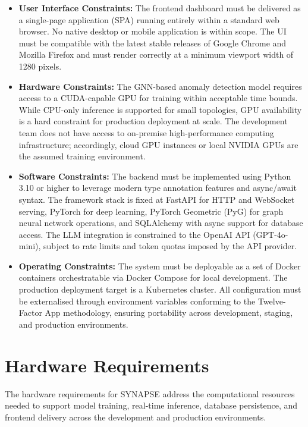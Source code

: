 \begin{itemize}

    \item \textbf{User Interface Constraints:} The frontend dashboard must be delivered as a single-page application (SPA) running entirely within a standard web browser. No native desktop or mobile application is within scope. The UI must be compatible with the latest stable releases of Google Chrome and Mozilla Firefox and must render correctly at a minimum viewport width of 1280 pixels.

    \item \textbf{Hardware Constraints:} The GNN-based anomaly detection model requires access to a CUDA-capable GPU for training within acceptable time bounds. While CPU-only inference is supported for small topologies, GPU availability is a hard constraint for production deployment at scale. The development team does not have access to on-premise high-performance computing infrastructure; accordingly, cloud GPU instances or local NVIDIA GPUs are the assumed training environment.

    \item \textbf{Software Constraints:} The backend must be implemented using Python 3.10 or higher to leverage modern type annotation features and async/await syntax. The framework stack is fixed at FastAPI for HTTP and WebSocket serving, PyTorch for deep learning, PyTorch Geometric (PyG) for graph neural network operations, and SQLAlchemy with async support for database access. The LLM integration is constrained to the OpenAI API (GPT-4o-mini), subject to rate limits and token quotas imposed by the API provider.

    \item \textbf{Operating Constraints:} The system must be deployable as a set of Docker containers orchestratable via Docker Compose for local development. The production deployment target is a Kubernetes cluster. All configuration must be externalised through environment variables conforming to the Twelve-Factor App methodology, ensuring portability across development, staging, and production environments.

\end{itemize}

\section{Hardware Requirements}

\hspace*{0.3in} The hardware requirements for SYNAPSE address the computational resources needed to support model training, real-time inference, database persistence, and frontend delivery across the development and production environments.\\\\

